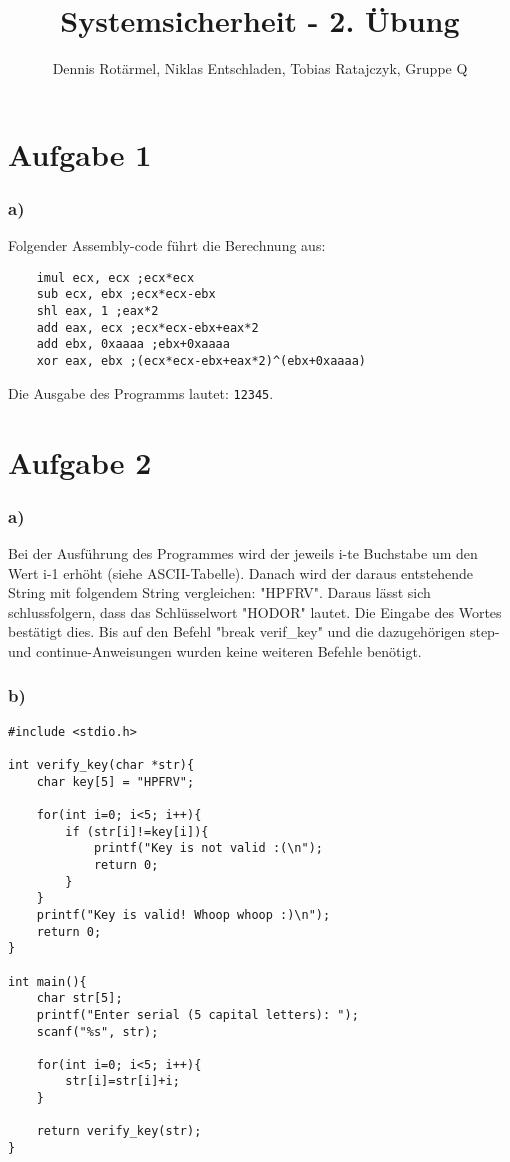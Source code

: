 \documentclass[]{scrreprt}
\title{Systemsicherheit - 2. Übung}
\author{Dennis Rotärmel, Niklas Entschladen, Tobias Ratajczyk, Gruppe Q}
\begin{document}
\maketitle
\chapter{Aufgabe 1}
\subsection*{a)}
Folgender Assembly-code führt die Berechnung aus:
\begin{lstlisting}
	imul ecx, ecx ;ecx*ecx
	sub ecx, ebx ;ecx*ecx-ebx
	shl eax, 1 ;eax*2
	add eax, ecx ;ecx*ecx-ebx+eax*2
	add ebx, 0xaaaa ;ebx+0xaaaa
	xor eax, ebx ;(ecx*ecx-ebx+eax*2)^(ebx+0xaaaa)
\end{lstlisting}
Die Ausgabe des Programms lautet: \texttt{12345}.
\chapter{Aufgabe 2}
\subsection*{a)}
Bei der Ausführung des Programmes wird der jeweils i-te Buchstabe um den Wert i-1 erhöht (siehe ASCII-Tabelle).
Danach wird der daraus entstehende String mit folgendem String vergleichen: "HPFRV".
Daraus lässt sich schlussfolgern, dass das Schlüsselwort "HODOR" lautet. Die Eingabe des Wortes bestätigt dies.
Bis auf den Befehl "break verif\_key" und die dazugehörigen step- und continue-Anweisungen wurden keine weiteren Befehle benötigt.
\subsection*{b)}
\begin{lstlisting}
#include <stdio.h>

int verify_key(char *str){
	char key[5] = "HPFRV";

	for(int i=0; i<5; i++){
		if (str[i]!=key[i]){
			printf("Key is not valid :(\n");
			return 0;
		}
	}
	printf("Key is valid! Whoop whoop :)\n");
	return 0;
}
	
int main(){
	char str[5];
	printf("Enter serial (5 capital letters): ");
	scanf("%s", str);
	
	for(int i=0; i<5; i++){
		str[i]=str[i]+i;
	}

	return verify_key(str);
}
\end{lstlisting}
\end{document}

